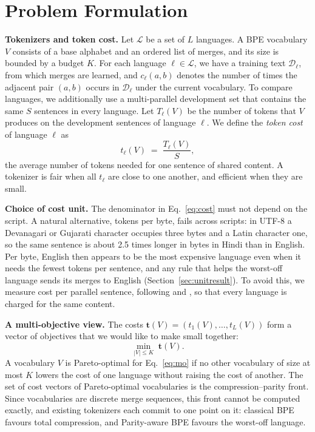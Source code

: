 \section{Problem Formulation}
\label{sec:problem}

\noindent\textbf{Tokenizers and token cost.}
Let $\mathcal{L}$ be a set of $L$ languages. A BPE vocabulary $V$ consists of a base
alphabet and an ordered list of merges, and its size is bounded by a budget $K$. For each
language $\ell\in\mathcal{L}$, we have a training text $\mathcal{D}_\ell$, from which merges
are learned, and $c_\ell(a,b)$ denotes the number of times the adjacent pair $(a,b)$ occurs
in $\mathcal{D}_\ell$ under the current vocabulary. To compare languages, we additionally
use a multi-parallel development set that contains the same $S$ sentences in every
language. Let $T_\ell(V)$ be the number of tokens that $V$ produces on the development
sentences of language $\ell$. We define the \emph{token cost} of language $\ell$ as
\begin{equation}
  t_\ell(V) \;=\; \frac{T_\ell(V)}{S},
  \label{eq:cost}
\end{equation}
the average number of tokens needed for one sentence of shared content. A tokenizer is fair
when all $t_\ell$ are close to one another, and efficient when they are small.

\noindent\textbf{Choice of cost unit.}
The denominator in Eq.~\eqref{eq:cost} must not depend on the script. A natural
alternative, tokens per byte, fails across scripts: in UTF-8 a Devanagari or Gujarati
character occupies three bytes and a Latin character one, so the same sentence is about
2.5 times longer in bytes in Hindi than in English. Per byte, English then appears to be the
most expensive language even when it needs the fewest tokens per sentence, and any rule that
helps the worst-off language sends its merges to English (Section~\ref{sec:unitresult}). To
avoid this, we measure cost per parallel sentence, following \citet{petrov2023} and
\citet{foroutan2026}, so that every language is charged for the same content.

\noindent\textbf{A multi-objective view.}
The costs $\mathbf{t}(V)=(t_1(V),\dots,t_L(V))$ form a vector of objectives that we would
like to make small together:
\begin{equation}
  \min_{|V|\le K}\; \mathbf{t}(V).
  \label{eq:mo}
\end{equation}
A vocabulary $V$ is Pareto-optimal for Eq.~\eqref{eq:mo} if no other vocabulary of size at
most $K$ lowers the cost of one language without raising the cost of another. The set of
cost vectors of Pareto-optimal vocabularies is the compression--parity front. Since
vocabularies are discrete merge sequences, this front cannot be computed exactly, and
existing tokenizers each commit to one point on it: classical BPE favours total
compression, and Parity-aware BPE favours the worst-off language.

